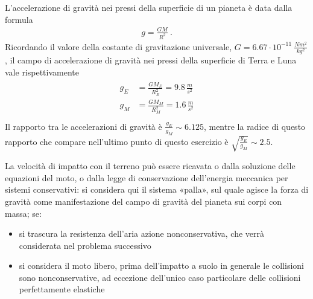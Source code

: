 \documentclass[letterpaper,10pt,italian]{jupyterBook}
\begin{document}
\sphinxAtStartPar
{} L’accelerazione di gravità nei pressi della superficie di un pianeta è data dalla formula  
\begin{equation*}
\begin{split}g = \frac{GM}{R^2} \ .\end{split}
\end{equation*}
\sphinxAtStartPar
Ricordando il valore della costante di gravitazione universale, \(G = 6.67 \cdot 10^{-11} \ \frac{N m^2}{kg^2}\), il campo di accelerazione di gravità nei pressi della superficie di Terra e Luna vale rispettivamente
\begin{equation*}
\begin{split}\begin{aligned} 
  g_E & = \frac{G M_E}{R_E^2} = 9.8 \, \frac{m}{s^2} \\
  g_M & = \frac{G M_M}{R_M^2} = 1.6 \, \frac{m}{s^2} \\
\end{aligned}\end{split}
\end{equation*}
\sphinxAtStartPar
Il rapporto tra le accelerazioni di gravità è \(\frac{g_E}{g_M} \sim 6.125\), mentre la radice di questo rapporto \sphinxhyphen{} che compare nell’ultimo punto di questo esercizio \sphinxhyphen{} è \(\sqrt{\frac{g_E}{g_M}} \sim 2.5\).

\sphinxAtStartPar
{} La velocità di impatto con il terreno può essere ricavata o dalla soluzione delle equazioni del moto, o dalla legge di conservazione dell’energia meccanica per sistemi conservativi: si considera qui il sistema «palla», sul quale agisce la forza di gravità \sphinxhyphen{} come manifestazione del campo di gravità del pianeta sui corpi con massa; se:
\begin{itemize}
\item {} 
\sphinxAtStartPar
si trascura la resistenza dell’aria \sphinxhyphen{} azione non\sphinxhyphen{}conservativa, che verrà considerata nel problema successivo \sphinxhyphen{}

\item {} 
\sphinxAtStartPar
si considera il moto libero, prima dell’impatto a suolo \sphinxhyphen{} in generale le collisioni sono non\sphinxhyphen{}conservative, ad eccezione dell’unico caso particolare delle collisioni perfettamente elastiche

\end{itemize}
\end{document}
